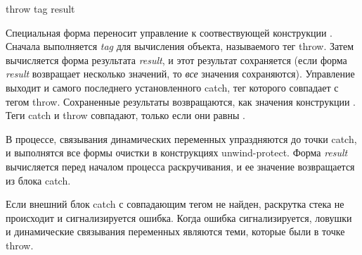 \begin{defspec}
throw tag result

Специальная форма  переносит управление к соотвествующей конструкции
.
Сначала выполняется \emph{tag} для вычисления объекта, называемого тег
throw. Затем вычисляется форма результата \emph{result}, и этот результат
сохраняется (если форма \emph{result} возвращает несколько значений, то
\emph{все} значения сохраняются).
Управление выходит и самого последнего установленного catch, тег которого
совпадает с тегом throw. Сохраненные результаты возвращаются, как значения
конструкции .
Теги catch и throw совпадают, только если они равны .

В процессе, связывания динамических переменных упраздняются до точки catch, и
выполнятся все формы очистки в конструкциях unwind-protect.
Форма \emph{result} вычисляется перед началом процесса раскручивания, и ее
значение возвращается из блока catch.

Если внешний блок catch с совпадающим тегом не найден, раскрутка стека не
происходит и сигнализируется ошибка.
Когда ошибка сигнализируется, ловушки и динамические связывания переменных
являются теми, которые были в точке throw.
\end{defspec}

\fi